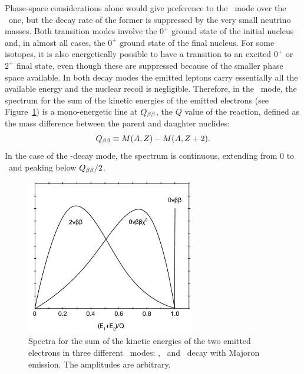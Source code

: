 \documentclass{PoS}
\begin{document}
Phase-space considerations alone would give preference to the \bbonu\ mode over the \bbtnu\ one, but the decay rate of the former is suppressed by the very small neutrino masses. Both transition modes involve the $0^{+}$ ground state of the initial nucleus and, in almost all cases, the $0^{+}$ ground state of the final nucleus. For some isotopes, it is also energetically possible to have a transition to an excited $0^{+}$ or $2^{+}$ final state, even though these are suppressed because of the smaller phase space available. In both decay modes the emitted leptons carry essentially all the available energy and the nuclear recoil is negligible. Therefore, in the \bbonu\ mode, the spectrum for the sum of the kinetic energies of the emitted electrons (see Figure~\ref{fig:BBModes}) is a mono-energetic line at $Q_{\beta\beta}$, the $Q$ value of the reaction, defined as the mass difference between the parent and daughter nuclides:
\begin{equation}
Q_{\beta\beta} \equiv M(A, Z) - M(A, Z+2).
\end{equation}
In the case of the \bbtnu-decay mode, the spectrum is continuous, extending from 0 to \Qbb\ and peaking below $Q_{\beta\beta}/2$.

\begin{figure}
\centering
\includegraphics[width=0.65\textwidth]{img/BBModes.pdf}
\caption{Spectra for the sum of the kinetic energies of the two emitted electrons  in three different \bb\ modes: \bbtnu, \bbonu\ and \bb\ decay with Majoron emission. The amplitudes are arbitrary.} \label{fig:BBModes}
\end{figure}
\end{document}
